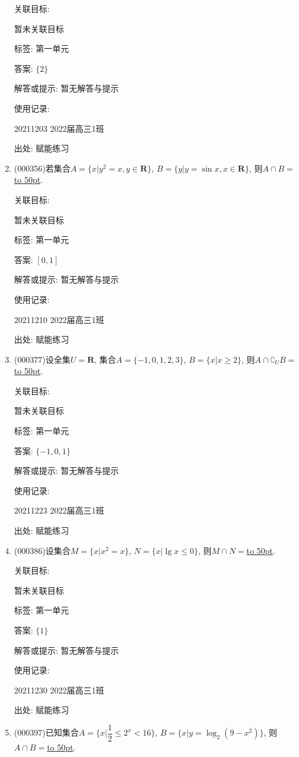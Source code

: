 \documentclass[10pt,a4paper]{article}
\newcommand{\blank}[1]{\underline{\hbox to #1pt{}}}
\begin{document}
\begin{enumerate}[1.]
关联目标:

暂未关联目标



标签: 第一单元

答案: $\{2\}$

解答或提示: 暂无解答与提示

使用记录:

20211203	2022届高三1班	


出处: 赋能练习
\item { (000356)}若集合$A=\{x|y^2=x,y\in \mathbf{R}\}$, $B=\{y|y=\sin x,x\in \mathbf{R}\}$, 则$A\cap B=$\blank{50}.


关联目标:

暂未关联目标



标签: 第一单元

答案: $[0,1]$

解答或提示: 暂无解答与提示

使用记录:

20211210	2022届高三1班	


出处: 赋能练习
\item { (000377)}设全集$U=\mathbf{R}$, 集合$A=\{-1,0,1,2,3\}$, $B=\{x|x\ge 2\}$, 则$A\cap {\complement_U}B=$\blank{50}.


关联目标:

暂未关联目标



标签: 第一单元

答案: $\{-1,0,1\}$

解答或提示: 暂无解答与提示

使用记录:

20211223	2022届高三1班	


出处: 赋能练习
\item { (000386)}设集合$M=\{x|x^2=x\}$, $N=\{x|\lg x\le 0\}$, 则$M\cap N=$\blank{50}.


关联目标:

暂未关联目标



标签: 第一单元

答案: $\{1\}$

解答或提示: 暂无解答与提示

使用记录:

20211230	2022届高三1班	


出处: 赋能练习
\item { (000397)}已知集合$A=\{x|\dfrac12\le {2^x}<16\}$, $B=\{x|y=\log _2(9-x^2)\}$, 则$A\cap B=$\blank{50}.



\end{enumerate}
\end{document}

